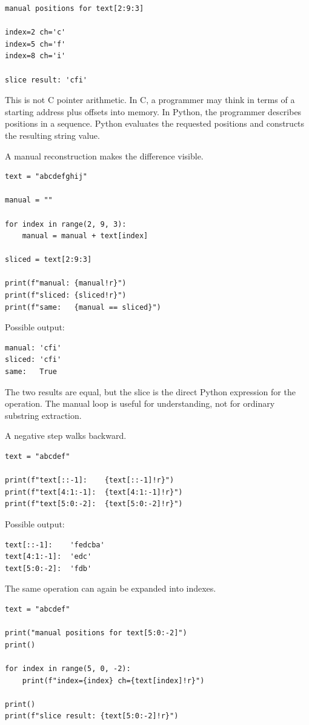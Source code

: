 \begin{verbatim}
manual positions for text[2:9:3]

index=2 ch='c'
index=5 ch='f'
index=8 ch='i'

slice result: 'cfi'
\end{verbatim}

This is not C pointer arithmetic. In C, a programmer may think in terms of a starting address plus offsets into memory. In Python, the programmer describes positions in a sequence. Python evaluates the requested positions and constructs the resulting string value.

A manual reconstruction makes the difference visible.

\begin{verbatim}
text = "abcdefghij"

manual = ""

for index in range(2, 9, 3):
    manual = manual + text[index]

sliced = text[2:9:3]

print(f"manual: {manual!r}")
print(f"sliced: {sliced!r}")
print(f"same:   {manual == sliced}")
\end{verbatim}

Possible output:

\begin{verbatim}
manual: 'cfi'
sliced: 'cfi'
same:   True
\end{verbatim}

The two results are equal, but the slice is the direct Python expression for the operation. The manual loop is useful for understanding, not for ordinary substring extraction.

A negative step walks backward.

\begin{verbatim}
text = "abcdef"

print(f"text[::-1]:    {text[::-1]!r}")
print(f"text[4:1:-1]:  {text[4:1:-1]!r}")
print(f"text[5:0:-2]:  {text[5:0:-2]!r}")
\end{verbatim}

Possible output:

\begin{verbatim}
text[::-1]:    'fedcba'
text[4:1:-1]:  'edc'
text[5:0:-2]:  'fdb'
\end{verbatim}

The same operation can again be expanded into indexes.

\begin{verbatim}
text = "abcdef"

print("manual positions for text[5:0:-2]")
print()

for index in range(5, 0, -2):
    print(f"index={index} ch={text[index]!r}")

print()
print(f"slice result: {text[5:0:-2]!r}")
\end{verbatim}

